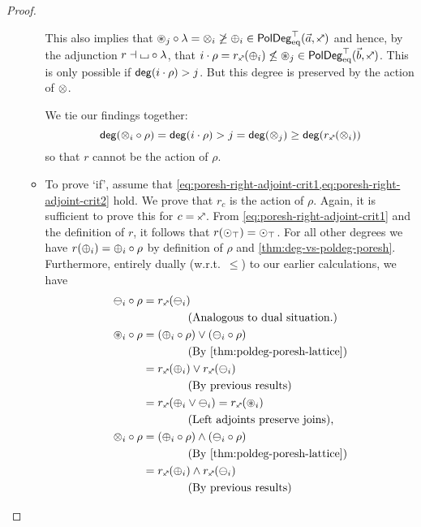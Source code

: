 \documentclass[a4paper]{memoir}
\begin{document}
\begin{proof}
\begin{enumerate}
\begin{itemize}
			This also implies that $\isopol_j \circ \lambda = \mixpol_i \not \geq \pospol_i \in \poldegeqtop(\vec a, \ypolar)$ and hence, by the adjunction $r \dashv {\llcorner\hspace{-.4ex}\lrcorner} \circ \lambda$, that $i \cdot \rho = r_\ypolar(\pospol_i) \not\leq \isopol_j \in \poldegeqtop(\vec b, \ypolar)$.
			This is only possible if $\mathsf{deg}(i \cdot \rho) > j$.
			But this degree is preserved by the action of ${\otimes}$.
			
			We tie our findings together:
			\[
				\getdeg(\mixpol_i \circ \rho) = \getdeg(i \cdot \rho) > j = \getdeg(\mixpol_j) \geq \getdeg(r_\ypolar(\mixpol_i))
			\]
			so that $r$ cannot be the action of $\rho$.
			
			\item To prove `if', assume that \cref{eq:poresh-right-adjoint-crit1,eq:poresh-right-adjoint-crit2} hold.
			We prove that $r_c$ is the action of $\rho$.
			Again, it is sufficient to prove this for $c = \ypolar$.
			From \cref{eq:poresh-right-adjoint-crit1} and the definition of $r$, it follows that $r({\odot}_\top) = {\odot}_\top$.
			For all other degrees we have $r({\oplus}_i) = {\oplus}_i \circ \rho$ by definition of $\rho$ and \cref{thm:deg-vs-poldeg-poresh}.
			Furthermore, entirely dually (w.r.t.\ $\leq$) to our earlier calculations, we have
			\begin{align*}
				\negpol_i \circ \rho &= r_\ypolar(\negpol_i) \\
				&\qquad \qquad \text{(Analogous to dual situation.)} \\
				\isopol_i \circ \rho
				&= (\pospol_i \circ \rho) \vee (\negpol_i \circ \rho) \\
				&\qquad \qquad \text{(By \cref{thm:poldeg-poresh-lattice})} \\
				&= r_\ypolar(\pospol_i) \vee r_\ypolar(\negpol_i) \\
				&\qquad \qquad \text{(By previous results)} \\
				&= r_\ypolar(\pospol_i \vee \negpol_i) = r_\ypolar(\isopol_i) \\
				&\qquad \qquad \text{(Left adjoints preserve joins),} \\
				\mixpol_i \circ \rho
				&= (\pospol_i \circ \rho) \wedge (\negpol_i \circ \rho) \\
				&\qquad \qquad \text{(By \cref{thm:poldeg-poresh-lattice})} \\
				&= r_\ypolar(\pospol_i) \wedge r_\ypolar(\negpol_i) \\
				&\qquad \qquad \text{(By previous results)} \\

\end{align*}
\end{itemize}
\end{enumerate}
\end{proof}
\end{document}
